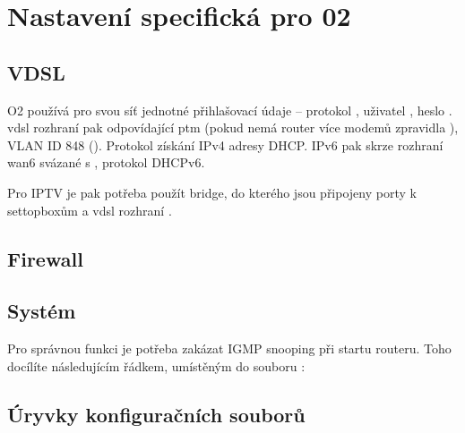 \section{Nastavení specifická pro 02}
\subsection{VDSL}
O2 používá pro svou síť jednotné přihlašovací údaje -- protokol ,
uživatel , heslo . \gls{vdsl} rozhraní pak odpovídající ptm
(pokud nemá router více modemů zpravidla ), VLAN ID 848 ().
Protokol získání IPv4 adresy DHCP. IPv6 pak skrze rozhraní wan6 svázané s ,
protokol DHCPv6.

Pro IPTV je pak potřeba použít bridge, do kterého jsou připojeny porty k
settopboxům a vdsl rozhraní .

\subsection{Firewall}

\subsection{Systém}
Pro správnou funkci je potřeba zakázat IGMP snooping při startu routeru. Toho
docílíte následujícím řádkem, umístěným do souboru : 

\subsection{Úryvky konfiguračních souborů}
